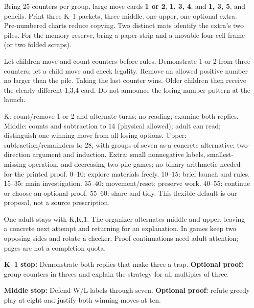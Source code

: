 \documentclass[11pt]{article}
\begin{document}
Bring 25 counters per group, large move cards \textbf{1 or 2}, \textbf{1, 3, 4}, and \textbf{1, 3, 5}, and pencils. Print three K--1 packets, three middle, one upper, one optional extra. Pre-numbered charts reduce copying. Two distinct mats identify the extra's two piles. For the memory reserve, bring a paper strip and a movable four-cell frame (or two folded scraps).

Let children move and count counters before rules. Demonstrate 1-or-2 from three counters; let a child move and check legality. Remove an allowed positive number no larger than the pile. Taking the last counter wins. Older children then receive the clearly different 1,3,4 card. Do not announce the losing-number pattern at the launch.

K: count/remove 1 or 2 and alternate turns; no reading; examine both replies. Middle: counts and subtraction to 14 (physical allowed); adult can read; distinguish one winning move from all losing options. Upper: subtraction/remainders to 28, with groups of seven as a concrete alternative; two-direction argument and induction. Extra: small nonnegative labels, smallest-missing operation, and decreasing two-pile games; no binary arithmetic needed for the printed proof.
0--10: explore materials freely. 10--15: brief launch and rules. 15--35: main investigation. 35--40: movement/reset; preserve work. 40--55: continue or choose an optional proof. 55--60: share and tidy. This flexible default is our proposal, not a source prescription.

One adult stays with K,K,1. The organizer alternates middle and upper, leaving a concrete next attempt and returning for an explanation. In games keep two opposing sides and rotate a checker. Proof continuations need adult attention; pages are not a completion quota.

\textbf{K--1 stop:} Demonstrate both replies that make three a trap. \textbf{Optional proof:} group counters in threes and explain the strategy for all multiples of three.

\textbf{Middle stop:} Defend W/L labels through seven. \textbf{Optional proof:} refute greedy play at eight and justify both winning moves at ten.
\end{document}
